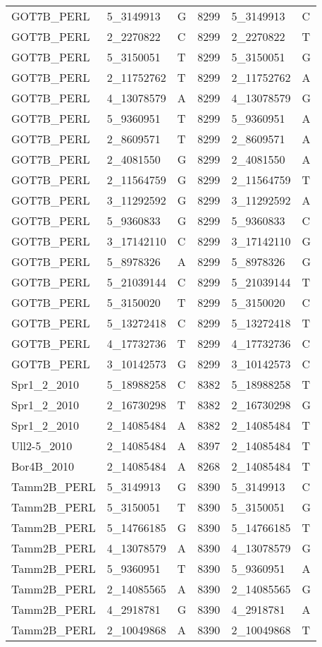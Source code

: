 \begin{center}
\begin{longtable}{|l|l|l|l|l|l|}
GOT7B\_PERL&5\_3149913&G&8299&5\_3149913&C\\
GOT7B\_PERL&2\_2270822&C&8299&2\_2270822&T\\
GOT7B\_PERL&5\_3150051&T&8299&5\_3150051&G\\
GOT7B\_PERL&2\_11752762&T&8299&2\_11752762&A\\
GOT7B\_PERL&4\_13078579&A&8299&4\_13078579&G\\
GOT7B\_PERL&5\_9360951&T&8299&5\_9360951&A\\
GOT7B\_PERL&2\_8609571&T&8299&2\_8609571&A\\
GOT7B\_PERL&2\_4081550&G&8299&2\_4081550&A\\
GOT7B\_PERL&2\_11564759&G&8299&2\_11564759&T\\
GOT7B\_PERL&3\_11292592&G&8299&3\_11292592&A\\
GOT7B\_PERL&5\_9360833&G&8299&5\_9360833&C\\
GOT7B\_PERL&3\_17142110&C&8299&3\_17142110&G\\
GOT7B\_PERL&5\_8978326&A&8299&5\_8978326&G\\
GOT7B\_PERL&5\_21039144&C&8299&5\_21039144&T\\
GOT7B\_PERL&5\_3150020&T&8299&5\_3150020&C\\
GOT7B\_PERL&5\_13272418&C&8299&5\_13272418&T\\
GOT7B\_PERL&4\_17732736&T&8299&4\_17732736&C\\
GOT7B\_PERL&3\_10142573&G&8299&3\_10142573&C\\
Spr1\_2\_2010&5\_18988258&C&8382&5\_18988258&T\\
Spr1\_2\_2010&2\_16730298&T&8382&2\_16730298&G\\
Spr1\_2\_2010&2\_14085484&A&8382&2\_14085484&T\\
Ull2-5\_2010&2\_14085484&A&8397&2\_14085484&T\\
Bor4B\_2010&2\_14085484&A&8268&2\_14085484&T\\
Tamm2B\_PERL&5\_3149913&G&8390&5\_3149913&C\\
Tamm2B\_PERL&5\_3150051&T&8390&5\_3150051&G\\
Tamm2B\_PERL&5\_14766185&G&8390&5\_14766185&T\\
Tamm2B\_PERL&4\_13078579&A&8390&4\_13078579&G\\
Tamm2B\_PERL&5\_9360951&T&8390&5\_9360951&A\\
Tamm2B\_PERL&2\_14085565&A&8390&2\_14085565&G\\
Tamm2B\_PERL&4\_2918781&G&8390&4\_2918781&A\\
Tamm2B\_PERL&2\_10049868&A&8390&2\_10049868&T\\

\end{longtable}
\end{center}
